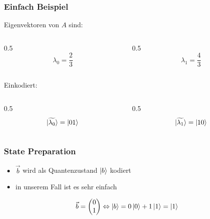 \begin{frame}
    \frametitle{Einfach Beispiel}

    Eigenvektoren von $A$ sind:    
    \begin{columns}[c]
        \begin{column}{0.5\hsize}\centering
            $$\lambda_0 = \frac{2}{3}$$
        \end{column}

        \begin{column}{0.5\hsize}
            $$\lambda_1 = \frac{4}{3}$$
        \end{column}
    \end{columns}

    \hfil

    \hfil

    Einkodiert:
    \begin{columns}[c]
        \begin{column}{0.5\hsize}\centering
            $$\ket{\widetilde{\lambda_0}} = \ket{01}$$
        \end{column}

        \begin{column}{0.5\hsize}
            $$\ket{\widetilde{\lambda_1}} = \ket{10}$$
        \end{column}
    \end{columns}
\end{frame}


\begin{frame}
    \frametitle{State Preparation}

    \begin{itemize}
        \item $\vec{b}$ wird als Quantenzustand $\ket{b}$ kodiert
        \item in unserem Fall ist es sehr einfach
    \end{itemize}

    $$\vec{b} = \begin{pmatrix} 0\\ 1\\ \end{pmatrix} \Leftrightarrow \ket{b} = 0 \ket{0} + 1 \ket{1} = \ket{1}$$
\end{frame}


